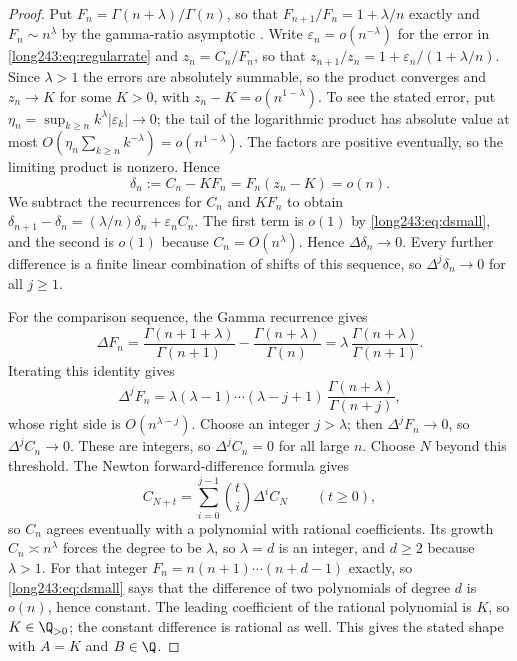 \begin{proof}
Put $F_n=\Gamma(n+\lambda)/\Gamma(n)$, so that $F_{n+1}/F_n=1+\lambda/n$
exactly and $F_n\sim n^\lambda$ by the gamma-ratio asymptotic
\cite[5.11.12]{dlmf_gamma}. Write $\varepsilon_n=o(n^{-\lambda})$ for the
error in \eqref{long243:eq:regularrate} and $z_n=C_n/F_n$, so that
$z_{n+1}/z_n=1+\varepsilon_n/(1+\lambda/n)$.  Since $\lambda>1$ the errors are
absolutely summable, so the product converges and $z_n\to K$ for some $K>0$,
with $z_n-K=o(n^{1-\lambda})$. To see the stated error, put
$\eta_n=\sup_{k\ge n}k^\lambda|\varepsilon_k|\to0$; the tail of the
logarithmic product has absolute value at most
$O(\eta_n\sum_{k\ge n}k^{-\lambda})=o(n^{1-\lambda})$.
The factors are positive eventually, so the limiting product is nonzero.  Hence
\begin{equation}\label{long243:eq:dsmall}
 \delta_n:=C_n-KF_n=F_n(z_n-K)=o(n).
\end{equation}
We subtract the recurrences for $C_n$ and $KF_n$ to obtain
$\delta_{n+1}-\delta_n=(\lambda/n)\delta_n+\varepsilon_nC_n$.
The first term is $o(1)$ by \eqref{long243:eq:dsmall}, and the second
is $o(1)$ because $C_n=O(n^\lambda)$. Hence $\Delta\delta_n\to0$.
Every further difference is a finite linear combination of shifts of
this sequence, so $\Delta^j\delta_n\to0$ for all $j\ge1$.

For the comparison sequence, the Gamma recurrence gives
\[
 \Delta F_n
 =\frac{\Gamma(n+1+\lambda)}{\Gamma(n+1)}
  -\frac{\Gamma(n+\lambda)}{\Gamma(n)}
 =\lambda\,\frac{\Gamma(n+\lambda)}{\Gamma(n+1)}.
\]
Iterating this identity gives
\[
 \Delta^jF_n=\lambda(\lambda-1)\cdots(\lambda-j+1)\,
 \frac{\Gamma(n+\lambda)}{\Gamma(n+j)},
\]
whose right side is $O(n^{\lambda-j})$.  Choose an integer $j>\lambda$; then
$\Delta^jF_n\to0$, so $\Delta^jC_n\to0$.  These are integers, so
$\Delta^jC_n=0$ for all large $n$. Choose $N$ beyond this threshold.
The Newton forward-difference formula gives
\[
 C_{N+t}=\sum_{i=0}^{j-1}\binom ti\Delta^iC_N\qquad(t\ge0),
\]
so $C_n$ agrees eventually with a polynomial with rational coefficients.
Its growth $C_n\asymp n^\lambda$ forces
the degree to be $\lambda$, so $\lambda=d$ is an integer, and $d\ge2$ because
$\lambda>1$.  For that integer $F_n=n(n+1)\cdots(n+d-1)$ exactly, so
\eqref{long243:eq:dsmall} says that the difference of two polynomials of degree $d$ is
$o(n)$, hence constant. The leading coefficient of the rational polynomial
is $K$, so $K\in\Q_{>0}$; the constant difference is rational as well.
This gives the stated shape with $A=K$ and $B\in\Q$.
\end{proof}

